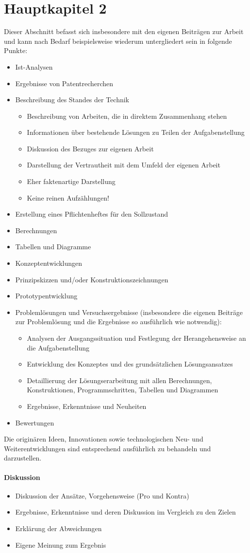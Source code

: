 \chapter{Hauptkapitel 2}
\label{sec: Hauptkapitel 2}

Dieser Abschnitt befasst sich insbesondere mit den eigenen Beiträgen zur Arbeit und kann nach Bedarf beispielsweise wiederum untergliedert sein in folgende Punkte:
\begin{itemize}
	\item Ist-Analysen
	\item Ergebnisse von Patentrecherchen
	\item Beschreibung des Standes der Technik
	\begin{itemize}
		\item Beschreibung von Arbeiten, die in direktem Zusammenhang stehen
		\item Informationen über bestehende Lösungen zu Teilen der Aufgabenstellung
		\item Diskussion des Bezuges zur eigenen Arbeit
		\item Darstellung der Vertrautheit mit dem Umfeld der eigenen Arbeit
		\item Eher faktenartige Darstellung
		\item Keine reinen Aufzählungen!
	\end{itemize}
	\item Erstellung eines Pflichtenheftes für den Sollzustand
	\item Berechnungen
	\item Tabellen und Diagramme
	\item Konzeptentwicklungen
	\item Prinzipskizzen und/oder Konstruktionszeichnungen
	\item Prototypentwicklung
	\item Problemlösungen und Versuchsergebnisse (insbesondere die eigenen Beiträge zur Problemlösung und die Ergebnisse so ausführlich wie notwendig):
	\begin{itemize}
		\item Analysen der Ausgangssituation und Festlegung der Herangehensweise an die Aufgabenstellung
		\item Entwicklung des Konzeptes und des grundsätzlichen Lösungsansatzes
		\item Detaillierung der Lösungserarbeitung mit allen Berechnungen, Konstruktionen, Programmschritten, Tabellen und Diagrammen \usw
		\item Ergebnisse, Erkenntnisse und Neuheiten
	\end{itemize}
	\item Bewertungen \usw
\end{itemize}	
Die originären Ideen, Innovationen sowie technologischen Neu- und Weiterentwicklungen sind entsprechend ausführlich zu behandeln und darzustellen.

\subsubsection*{Diskussion}
\begin{itemize}
	\item Diskussion der Ansätze, Vorgehensweise (Pro und Kontra)
	\item Ergebnisse, Erkenntnisse und deren Diskussion im Vergleich zu den Zielen
	\item Erklärung der Abweichungen
	\item Eigene Meinung zum Ergebnis
\end{itemize}
